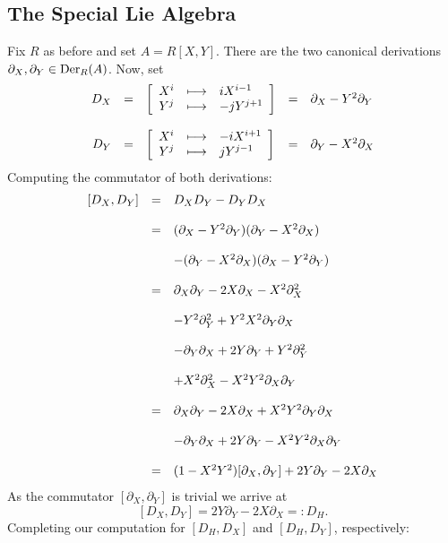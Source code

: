 \subsection{The Special Lie Algebra} 

Fix $R$ as before and set $A = R[X,Y]$. There are the two canonical derivations $\partial_X, \partial_Y \in \dera$. Now, set
$$\bao{rclcl}
D_X &=& \left[\bao{rcl}
X^i &\longmapsto& i X^{i-1}\\
Y^j &\longmapsto& -j Y^{j+1}\\
\ea\right] &=& \partial_X - Y^2 \partial_Y\\
&&&&\\
D_Y &=& \left[\bao{rcl}
X^i &\longmapsto& -i X^{i+1}\\
Y^j &\longmapsto& j Y^{j-1}\\
\ea\right] &=& \partial_Y - X^2 \partial_X\\
\ea$$
Computing the commutator of both derivations:
$$\bao{rcl}
[D_X,D_Y] &=& D_X D_Y - D_Y D_X\\
&&\\
 &=& (\partial_X - Y^2 \partial_Y)(\partial_Y - X^2 \partial_X)\\
 &&\\
 && - (\partial_Y - X^2 \partial_X) (\partial_X - Y^2 \partial_Y)\\
 &&\\
 &=& \partial_X \partial_Y - 2 X \partial_X - X^2 \partial_X^2\\
 &&\\
 && - Y^2 \partial_Y^2 + Y^2 X^2 \partial_Y \partial_X\\
 &&\\
 && - \partial_Y \partial_X + 2 Y \partial_Y + Y^2 \partial_Y^2\\
 &&\\ 
 && + X^2 \partial_X^2 - X^2 Y^2 \partial_X \partial_Y\\
 &&\\
 &=& \partial_X \partial_Y - 2 X \partial_X + X^2 Y^2 \partial_Y \partial_X \\
 &&\\
 && - \partial_Y \partial_X + 2 Y \partial_Y - X^2 Y^2 \partial_X \partial_Y\\
 &&\\
 &=& (1 - X^2 Y^2) [\partial_X,\partial_Y] + 2 Y \partial_Y - 2 X \partial_X\\
\ea$$
As the commutator $[\partial_X,\partial_Y]$ is trivial we arrive at
$$[D_X,D_Y] = 2 Y \partial_Y - 2 X \partial_X =: D_H.$$
Completing our computation for $[D_H,D_X]$ and $[D_H,D_Y]$, respectively:
